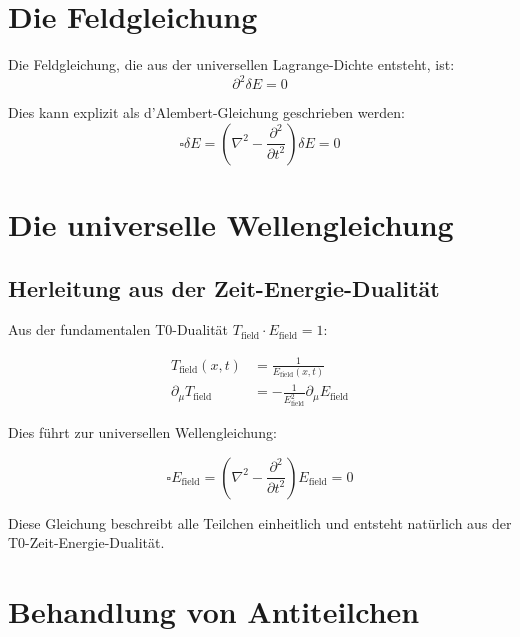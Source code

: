\documentclass[12pt,a4paper]{report}
\begin{document}
	\section{Die Feldgleichung}
	
	Die Feldgleichung, die aus der universellen Lagrange-Dichte entsteht, ist:
	\begin{equation}
		\boxed{\partial^2 \delta E = 0}
		\label{eq:field_equation}
	\end{equation}
	
	Dies kann explizit als d'Alembert-Gleichung geschrieben werden:
	\begin{equation}
		\square \delta E = \left(\nabla^2 - \frac{\partial^2}{\partial t^2}\right) \delta E = 0
	\end{equation}
	
	\section{Die universelle Wellengleichung}
	
	\subsection{Herleitung aus der Zeit-Energie-Dualität}
	\label{subsec:derivation_wave_equation}
	
	Aus der fundamentalen T0-Dualität $T_{\text{field}} \cdot E_{\text{field}} = 1$:
	
	\begin{align}
		T_{\text{field}}(x,t) &= \frac{1}{E_{\text{field}}(x,t)} \\
		\partial_\mu T_{\text{field}} &= -\frac{1}{E_{\text{field}}^2} \partial_\mu E_{\text{field}}
	\end{align}
	
	Dies führt zur universellen Wellengleichung:
	
	\begin{equation}
		\square E_{\text{field}} = \left(\nabla^2 - \frac{\partial^2}{\partial t^2}\right) E_{\text{field}} = 0
		\label{eq:universal_wave_equation}
	\end{equation}
	
	Diese Gleichung beschreibt alle Teilchen einheitlich und entsteht natürlich aus der T0-Zeit-Energie-Dualität.
	
	\section{Behandlung von Antiteilchen}
	
\end{document}
